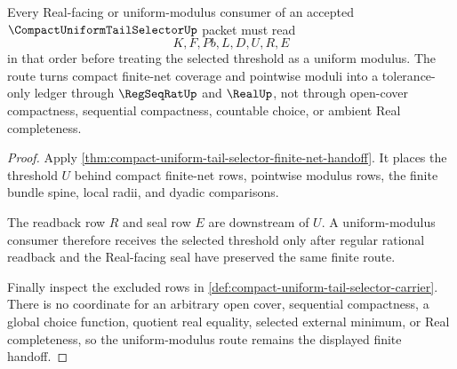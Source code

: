 \begin{theorem}
\label{thm:compact-uniform-tail-selector-uniform-modulus-route}
Every Real-facing or uniform-modulus consumer of an accepted $\CompactUniformTailSelectorUp$ packet must read
$$
K,F,Pb,L,D,U,R,E
$$
in that order before treating the selected threshold as a uniform modulus. The route turns compact finite-net coverage and pointwise moduli into a tolerance-only ledger through $\RegSeqRatUp$ and $\RealUp$, not through open-cover compactness, sequential compactness, countable choice, or ambient Real completeness.
\end{theorem}
\begin{proof}
Apply \autoref{thm:compact-uniform-tail-selector-finite-net-handoff}. It places the threshold $U$ behind compact finite-net rows, pointwise modulus rows, the finite bundle spine, local radii, and dyadic comparisons.

The readback row $R$ and seal row $E$ are downstream of $U$. A uniform-modulus consumer therefore receives the selected threshold only after regular rational readback and the Real-facing seal have preserved the same finite route.

Finally inspect the excluded rows in \autoref{def:compact-uniform-tail-selector-carrier}. There is no coordinate for an arbitrary open cover, sequential compactness, a global choice function, quotient real equality, selected external minimum, or Real completeness, so the uniform-modulus route remains the displayed finite handoff.
\end{proof}




